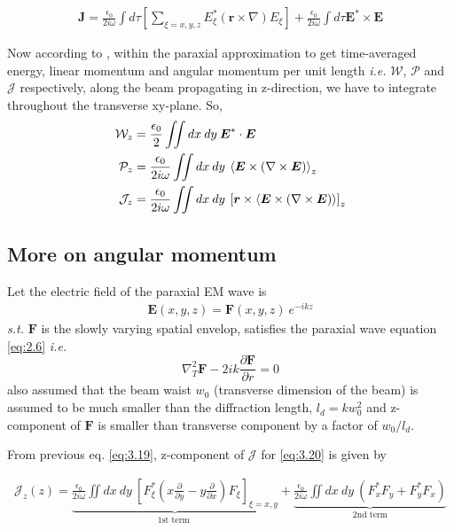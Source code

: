 \documentclass[11pt,a4paper]{article}
\numberwithin{equation}{section}
\begin{document}
\begin{align}
	 \boldsymbol{J}=\frac{\epsilon_0}{2i\omega}\int d\tau \left[\sum_{\xi=x,y,z}E_\xi^\ast(\boldsymbol{r}\times\nabla)E_\xi\right]+ \frac{\epsilon_0}{2i\omega}\int d\tau \boldsymbol{E}^\ast\times \boldsymbol{E}
\end{align}

Now according to \cite{bernatt allen 94}\cite{enk nien 92}, within the paraxial approximation to get time-averaged energy, linear momentum and angular momentum per unit length \textit{i.e.} $\mathcal{W}$, $\mathcal{P}$ and $\mathcal{J}$ respectively, along the beam propagating in z-direction, we have to integrate throughout the transverse xy-plane. So,
\begin{align}
	\mathcal{W}_z&=\frac{\epsilon_0}{2}\iint dx\:dy\: \boldsymbol{E}^\ast\cdot\boldsymbol{E}\label{eq:3.17}\\
	\mathcal{P}_z&=\frac{\epsilon_0}{2i\omega}\iint  dx\:dy\: \expval{\boldsymbol{E}\times (\nabla\times\boldsymbol{E})}_z\\
	\mathcal{J}_z&=\frac{\epsilon_0}{2i\omega}\iint dx\:dy\: \left[\boldsymbol{r}\times\expval{\boldsymbol{E}\times (\nabla\times\boldsymbol{E})}\right]_z
	\label{eq:3.19}
\end{align}


\subsection{More on angular momentum}
Let the electric field of the paraxial EM wave is \cite{WO} 
\begin{align}
	\boldsymbol{E}(x,y,z)=\boldsymbol{F}(x,y,z)\:e^{-ikz} \label{eq:3.20}
\end{align}
\textit{s.t.} $\boldsymbol{F}$ is the slowly varying spatial envelop, satisfies the paraxial wave equation \ref{eq:2.6} \textit{i.e.}
$$\nabla_T ^2\boldsymbol{F} -2ik \frac{\partial\boldsymbol{F}}{\partial r}=0$$
also assumed that the beam waist $w_0$ (transverse dimension of the beam) is
assumed to be much smaller than the diffraction length, $l_d = kw_0^2$ and z- component of $\boldsymbol{F}$ is smaller than transverse component by a factor of $w_0/l_d$. \cite{melvin 75}\cite{enk nien 92}\cite{WO}

From previous eq. \ref{eq:3.19}, z-component of $\mathcal{J}$ for \ref{eq:3.20} is given by

\begin{align}
	\mathcal{J}_z (z)
	= \underbrace{\frac{\epsilon_0}{2i\omega} \iint dx\:dy\:\left[F_\xi^\ast\left(x\frac{\partial}{\partial y} - y\frac{\partial}{\partial x}\right)F_\xi\right]_{\xi=x,y}}_{\text{1st term }}
	+\underbrace{\frac{\epsilon_0}{2i\omega}\iint dx\:dy\: (F_x^\ast F_y + F_y^\ast F_x)}_{\text{2nd term}} \label{eq:3.21}
\end{align}
\end{document}
